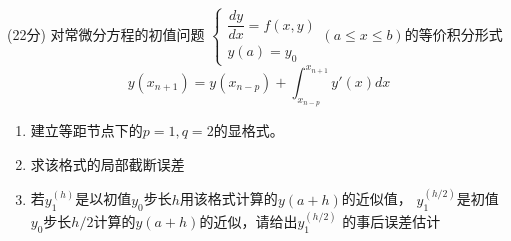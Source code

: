 \documentclass[12pt,letter]{ustcexam}
\begin{document}
\begin{CJK*}{UTF8}{song}
\begin{problems}
\newpage
\qu (22分)
对常微分方程的初值问题
$\left\{\begin{array}{l} \dfrac{dy}{dx}=f(x,y) \\ y(a)=y_0\end{array}\right. 
 (a\leqslant x \leqslant b)$的等价积分形式
$$y(x_{n+1})=y(x_{n-p})+\int_{x_{n-p}}^{x_{n+1}}y'(x)dx$$
\begin{enumerate}
  \item 建立等距节点下的$p=1,q=2$的显格式。
  \item 求该格式的局部截断误差
  \item 若$y_1^{(h)}$是以初值$y_0$步长$h$用该格式计算的$y(a+h)$的近似值，
  $y_1^{(h/2)}$是初值$y_0$步长$h/2$计算的$y(a+h)$的近似，请给出$y_1^{(h/2)}$
  的事后误差估计
\end{enumerate}

\newpage

\end{problems}


\clearpage
{}
\clearpage

\end{CJK*}
\end{document}
